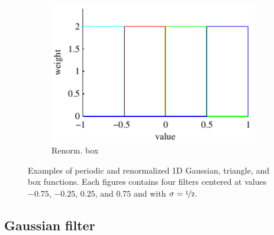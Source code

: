 \documentclass[thesis.tex]{subfiles}
\begin{document}
\begin{figure}
\begin{subfigure}[t]{0.32\textwidth}
		\includegraphics[width=\textwidth]{img/binFilterBoxRenorm.pdf}
		\caption{Renorm. box}
		\label{fig:1dFilterBoxRenorm}
	\end{subfigure}
	\caption{Examples of periodic and renormalized 1D Gaussian, triangle, and box functions. Each figures contains four filters centered at values $-0.75$, $-0.25$, $0.25$, and $0.75$ and with $\sigma = \nicefrac{1}{2}$.}
	\label{fig:1dFilters}
\end{figure}
%
\subsection{Gaussian filter}
\label{sec:histogramsGaussianFilter}
\end{document}
